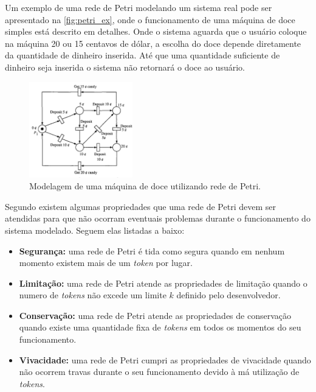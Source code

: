 Um exemplo de uma rede de Petri modelando um sistema real pode ser apresentado na \autoref{fig:petri_ex}, onde o funcionamento de uma máquina de doce simples está descrito em detalhes. Onde o sistema aguarda que o usuário coloque na máquina 20 ou 15 centavos de dólar, a escolha do doce depende diretamente da quantidade de dinheiro inserida. Até que uma quantidade suficiente de dinheiro seja inserida o sistema não retornará o doce ao usuário. \cite{murata:1989}

\begin{figure}[ht]
    \centering
    \includegraphics[width=0.4\textwidth, keepaspectratio]{resources/petriexemplo.png}
    \caption{Modelagem de uma máquina de doce utilizando rede de Petri. \cite{murata:1989}}
    \label{fig:petri_ex}
\end{figure}

Segundo  existem algumas propriedades que uma rede de Petri devem ser atendidas para que não ocorram eventuais problemas durante o funcionamento do sistema modelado. Seguem elas listadas a baixo:


\begin{itemize}
    \item \textbf{Segurança:} uma rede de Petri é tida como segura quando em nenhum momento existem mais de um \textit{token} por lugar. 
    \item \textbf{Limitação:} uma rede de Petri atende as propriedades de limitação quando o numero de \textit{tokens} não excede um limite $k$ definido pelo desenvolvedor.
    \item \textbf{Conservação:} uma rede de Petri atende as propriedades de conservação quando existe uma quantidade fixa de \textit{tokens} em todos os momentos do seu funcionamento.
    \item \textbf{Vivacidade:} uma rede de Petri cumpri as propriedades de vivacidade quando não ocorrem travas durante o seu funcionamento devido à má utilização de \textit{tokens}.
\end{itemize}






